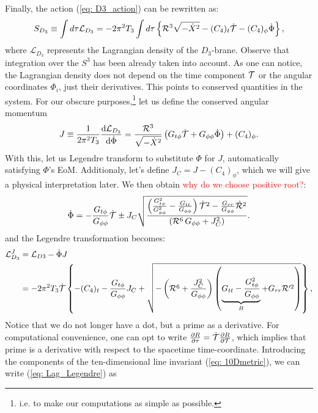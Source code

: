 Finally, the action (\ref{eq: D3_action}) can be rewritten as:
\begin{equation}\label{eq: Lag_density_action}
    S_{D_{3}} \equiv \int d\tau \mathcal{L}_{D_{3}}  = -2\pi^2 T_3 \int d\tau \left\{ \mathcal{R}^3 \sqrt{ -\dot X^2 } - (C_4)_t \dot{\mathcal{T}} - (C_4)_{\phi} \dot\Phi \right\},
\end{equation}
where $\mathcal{L}_{D_{3}}$ represents the Lagrangian density of the $D_{3}$-brane. Observe that integration over the $S^3$ has been already taken into account. As one can notice, the Lagrangian density does not depend on the time component $\mathcal{T}$ or the angular coordinates $\Phi_{i}$, just their derivatives. This points to conserved quantities in the system. For our obscure purposes,\footnote{i.e. to make our computations as simple as possible.} let us define the conserved angular momentum
\begin{equation}
 J \equiv \frac{1}{2\pi^2 T_3}\frac{\text{d}\mathcal{L}_{D_{3}}}{\text{d} \dot\Phi} = \frac{\mathcal{R}^3 }{\sqrt{ -\dot X^2 }} \left(G_{t\phi} \dot{\mathcal{T}} + G_{\phi\phi} \dot\Phi \right) + (C_4)_\phi.
\end{equation}
With this, let us Legendre transform to substitute $\dot\Phi$ for $J$, automatically satisfying $\Phi$'s EoM. Additionaly, let's define $J_C = J-(C_4)_\phi$, which we will give a physical interpretation later. We then obtain \textcolor{red}{why do we choose positive root?}:
\begin{equation}
 \dot\Phi = -\frac{G_{t\phi}}{G_{\phi\phi}}\dot{\mathcal{T}} \pm J_C \sqrt{\frac{\left(\frac{G_{t\phi}^2}{G_{\phi\phi}^2}-\frac{G_{tt}}{G_{\phi\phi}} \right) \dot{\mathcal{T}}^2 - \frac{G_{rr}}{G_{\phi\phi}} \dot{\mathcal{R}}^2 }{\left(\mathcal{R}^6\, G_{\phi\phi} + J_C^2\right)}}.
\end{equation}
and the Legendre transformation becomes:
\begin{equation}\label{eq: Lag_Legendre}
\begin{split}
 \mathcal{L}_{D_{3}}^J &= \mathcal{L}_{D3} - \dot\Phi J \\
 &= -2\pi^2 T_3 \dot{\mathcal{T}} \left\{-(C_4)_t  - \frac{G_{t\phi}}{G_{\phi\phi}}J_C  + \sqrt{-\left(\mathcal{R}^6 + \frac{J_C^2}{G_{\phi\phi}}\right) \left( \underbrace{G_{tt}-\frac{G_{t\phi}^2}{G_{\phi\phi}}}_{B} + G_{rr} \mathcal{R}'^2 \right) } \right\},
 \end{split}
\end{equation}
Notice that we do not longer have a dot, but a prime as a derivative. For computational convenience, one can opt to write $\tfrac{\partial R}{\partial \tau} = \dot{\mathcal{T}} \tfrac{\partial R}{\partial \mathcal{T}}$, which implies that prime is a derivative with respect to the spacetime time-coordinate. Introducing the components of the ten-dimensional line invariant (\ref{eq: 10Dmetric}), we can write (\ref{eq: Lag_Legendre}) as

